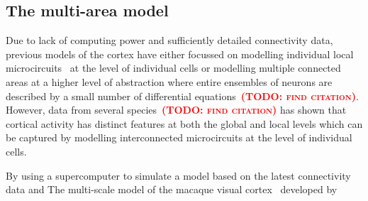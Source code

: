 \documentclass[9pt,twocolumn,twoside,lineno]{pnas-new}
\newcommand{\todo}[1]{\textbf{\textsc{\textcolor{red}{(TODO: #1)}}}}
\begin{document}
\subsection*{The multi-area model}
Due to lack of computing power and sufficiently detailed connectivity data, previous models of the cortex have either focussed on modelling individual local microcircuits~\citep{Izhikevich2008,Potjans2012} at the level of individual cells or modelling multiple connected areas at a higher level of abstraction where entire ensembles of neurons are described by a small number of differential equations~\todo{find citation}.
However, data from several species~\todo{find citation} has shown that cortical activity has distinct features at both the global and local levels which can be captured by modelling interconnected microcircuits at the level of individual cells.

By using a supercomputer to simulate a model based on the latest connectivity data and The multi-scale model of the macaque visual cortex~\citep{Schmidt2018} developed by 
\end{document}
